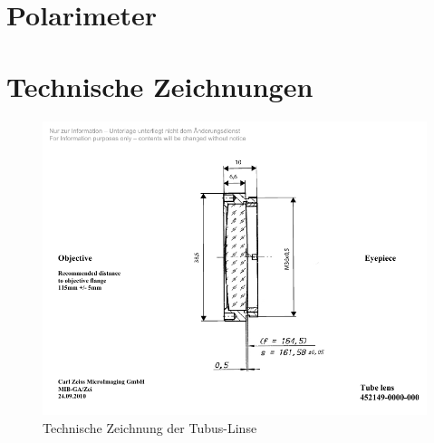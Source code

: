 \documentclass[titlepage]{article}
\begin{document}
	\section{Polarimeter}
	\newpage
	\section{Technische Zeichnungen}
	\begin{figure}[h!]
		\centering
		\includegraphics[width=1\linewidth]{figures/tube_lense_tz}
		\caption{Technische Zeichnung der Tubus-Linse}
		\label{fig:tubelensetz}
	\end{figure}
	
\end{document}

